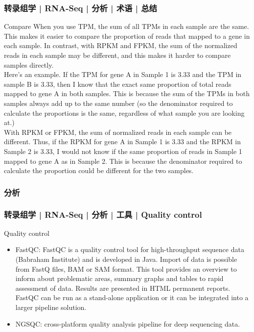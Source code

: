 \begin{frame}
  \frametitle{转录组学 | RNA-Seq | 分析 | 术语 | 总结}
  {\footnotesize
  \begin{block}{Compare}
    When you use TPM, the sum of all TPMs in each sample are the same. This makes it easier to compare the proportion of reads that mapped to a gene in each sample. In contrast, with RPKM and FPKM, the sum of the normalized reads in each sample may be different, and this makes it harder to compare samples directly.\\
    \vspace{0.5em}
    Here's an example. If the TPM for gene A in Sample 1 is 3.33 and the TPM in sample B is 3.33, then I know that the exact same proportion of total reads mapped to gene A in both samples. This is because the sum of the TPMs in both samples always add up to the same number (so the denominator required to calculate the proportions is the same, regardless of what sample you are looking at.)\\
    \vspace{0.5em}
    With RPKM or FPKM, the sum of normalized reads in each sample can be different. Thus, if the RPKM for gene A in Sample 1 is 3.33 and the RPKM in Sample 2 is 3.33, I would not know if the same proportion of reads in Sample 1 mapped to gene A as in Sample 2. This is because the denominator required to calculate the proportion could be different for the two samples.
  \end{block}
  }
\end{frame}

\subsubsection{分析}
\begin{frame}
  \frametitle{转录组学 | RNA-Seq | 分析 | 工具 | Quality control}
  \begin{block}{Quality control}
    \begin{itemize}
      \item FastQC: FastQC is a quality control tool for high-throughput sequence data (Babraham Institute) and is developed in Java. Import of data is possible from FastQ files, BAM or SAM format. This tool provides an overview to inform about problematic areas, summary graphs and tables to rapid assessment of data. Results are presented in HTML permanent reports. FastQC can be run as a stand-alone application or it can be integrated into a larger pipeline solution.
      \item NGSQC: cross-platform quality analysis pipeline for deep sequencing data.
    \end{itemize}
  \end{block}
\end{frame}

